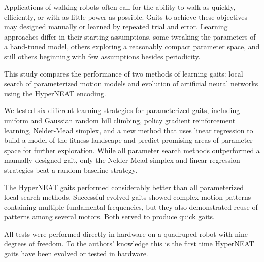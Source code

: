 Applications of walking robots often call for the ability to walk as
quickly, efficiently, or with as little power as possible.  Gaits to
achieve these objectives may designed manually or learned by repeated
trial and error.
Learning approaches differ in their starting assumptions, some
tweaking the parameters of a hand-tuned model, others exploring a
reasonably compact parameter space, and still others beginning with
few assumptions besides periodicity.

This study compares the performance of two methods of learning gaits:
local search of parameterized motion models and evolution of
artificial neural networks using the HyperNEAT encoding.

We tested six different learning strategies for parameterized gaits,
including uniform and Gaussian random hill climbing, policy gradient
reinforcement learning, Nelder-Mead simplex, and a new method that
uses linear regression to build a model of the fitness landscape and
predict promising areas of parameter space for further exploration.
While all parameter search methods outperformed a manually designed
gait, only the Nelder-Mead simplex and linear regression strategies
beat a random baseline strategy.

The HyperNEAT gaits performed considerably better than all
parameterized local search methods.  Successful evolved gaits showed
complex motion patterns containing multiple fundamental frequencies,
but they also demonstrated reuse of patterns among several motors.
Both served to produce quick gaits.

All tests were performed directly in hardware on a quadruped robot
with nine degrees of freedom.  To the authors' knowledge this is the
first time HyperNEAT gaits have been evolved or tested in hardware.

